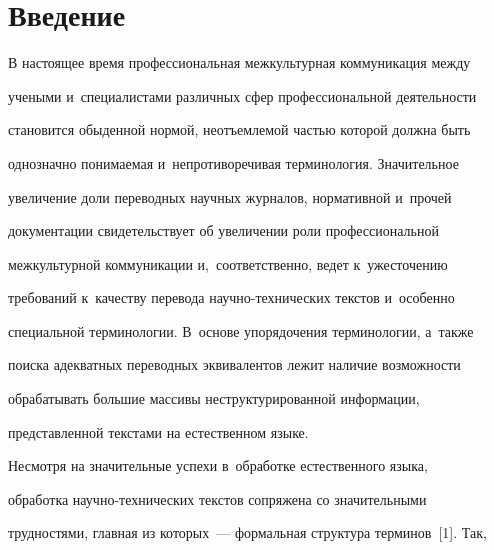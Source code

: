  


 \vspace*{-20pt}





\section{Введение}





\vspace*{-4pt}





  В настоящее время профессиональная межкультурная коммуникация между 


учеными и~специалистами различных сфер профессиональной деятельности 


становится обыденной нормой, неотъемлемой частью которой должна быть 


однозначно понимаемая и~непротиворечивая терминология. Значительное 


увеличение доли переводных научных журналов, нормативной и~прочей 


документации свидетельствует об увеличении роли профессиональной 


межкультурной коммуникации и,~соответственно, ведет к~ужесточению 


требований к~качеству перевода на\-уч\-но-тех\-ни\-че\-ских текстов и~особенно 


специальной терминологии. В~основе упорядочения терминологии, а~также 


поиска адекватных переводных эквивалентов лежит наличие возможности 


обрабатывать большие массивы неструктурированной информации, 


пред\-став\-лен\-ной текс\-та\-ми на естественном языке.





\pagebreak


  


  Несмотря на значительные успехи в~обработке естественного языка, 


обработка на\-уч\-но-тех\-ни\-че\-ских текстов сопряжена со значительными 


трудностями, главная из которых~--- формальная структура терминов~[1]. Так, 


